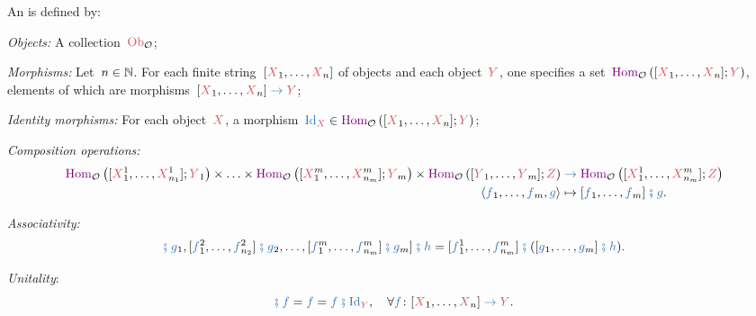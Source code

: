 \begin{ctdefinition}[Operad]
    \label{def:operad}
    An \emph{} is defined by:

    \constit
    \begin{compactenum}
        \item \emph{Objects:} A collection~$\Ob_\operada$;
        \item \emph{Morphisms:} Let~$n\in \mathbb{N}$.
        For each finite string~$[\Obja_1,\ldots, \Obja_n]$ of objects and each object~$    \Objb$, one specifies a set~$\HomSet{\operada}{[\Obja_1,\ldots,\Obja_n]}{\Objb}$,
        elements of which are morphisms~$[\Obja_1,\ldots,\Obja_n]\mto \Objb$;
        \item \emph{Identity morphisms:} For each object~$\Obja$, a morphism~$\catid_\Obja \in \HomSet{\operada}{[\Obja_1,\ldots,        \Obja_n]}{\Objb}$;
        \item \emph{Composition operations:}
        \begin{equation}
            \begin{aligned}
                \HomSet{\operada}{[\Obja_{1}^1, \ldots, \Obja_{n_1}^1]}{\Objb_1}\times \ldots \times  \HomSet{\operada}{[\Obja_{1}^m, \ldots, \Obja_{n_m}^m]}{\Objb_m}\times  \HomSet{\operada}{[\Objb_{1}, \ldots,\Objb_{m}]}{\Objc} &
                \mto  \HomSet{\operada}{[\Obja_{1}^1, \ldots, \Obja_{n_m}^m]}{\Objc}                                                                                                                                                                                                   \\
                \tup{\mora_1,\ldots,\mora_m,\morb}                                                                                                                                                                                    & \mapsto [\mora_1,\ldots, \mora_m]\mthen \morb.
            \end{aligned}
        \end{equation}
    \end{compactenum}
    \condit
    \begin{compactenum}
        \item \emph{Associativity:}
        \begin{equation}
            [[\mora_{1}^1,\ldots, \mora_{n_1}^1]\mthen \morb_1,[\mora_{1}^2,\ldots, \mora_{n_2}^2]\mthen \morb_2,\ldots, [\mora_{1}^m,\ldots, \mora_{n_m}^m]\mthen \morb_m ]\mthen \morc=[\mora_{1}^1,\ldots, \mora_{n_m}^m]\mthen ([\morb_{1},\ldots, \morb_{m}]\mthen \morc).
        \end{equation}
        \item \emph{Unitality}:
        \begin{equation}
            [\catid_{\Obja_1},\ldots, \catid_{\Obja_n}]
            \mthen \mora = \mora = \mora \mthen \catid_{\Objb}, \quad \forall \mora\colon [\Obja_1,\ldots,\Obja_n]\mto \Objb.
        \end{equation}
    \end{compactenum}
\end{ctdefinition}

